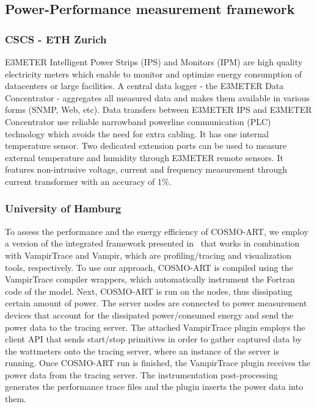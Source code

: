 \subsection{Power-Performance measurement framework}
\label{subsec:2.2}

\subsubsection{CSCS - ETH Zurich}
E3METER  Intelligent Power Strips  (IPS) and  Monitors (IPM)  are high
quality electricity meters which enable to monitor and optimize energy
consumption of datacenters or large facilities.  A central data logger
- the  E3METER Data Concentrator  - aggregates  all measured  data and
makes them available in various forms (SNMP, Web, etc). Data transfers
between E3METER  IPS and E3METER Concentrator  use reliable narrowband
powerline  communication (PLC)  technology which  avoids the  need for
extra cabling.  It has  one internal temperature sensor. Two dedicated
extension  ports  can be  used  to  measure  external temperature  and
humidity  through E3METER  remote sensors.  It  features non-intrusive
voltage, current and frequency measurement through current transformer
with an accuracy of 1\%.

\subsubsection{University of Hamburg}
To assess the  performance and the energy efficiency  of COSMO-ART, we
employ   a    version   of   the    integrated   framework   presented
in~\cite{energy13}  that  works in  combination  with VampirTrace  and
Vampir,   which  are   profiling/tracing   and  visualization   tools,
respectively.
To  use our  approach,  COSMO-ART is  compiled  using the  VampirTrace
compiler wrappers, which automatically  instrument the Fortran code of
the  model. Next,  COSMO-ART is  run  on the  nodes, thus  dissipating
certain  amount of  power.  The  server nodes  are connected  to power
measurement  devices that  account for  the  dissipated power/consumed
energy and  send the power data  to the tracing  server.  The attached
VampirTrace \pmlib plugin employs the client API that sends start/stop
primitives in order to gather captured data by the wattmeters onto the
tracing server,  where an  instance of the  \pmlib server  is running.
Once COSMO-ART run is finished, the VampirTrace \pmlib plugin receives
the  power   data  from  the  tracing   server.   The  instrumentation
post-processing generates  the performance trace files  and the \pmlib
plugin inserts the power data into them.

